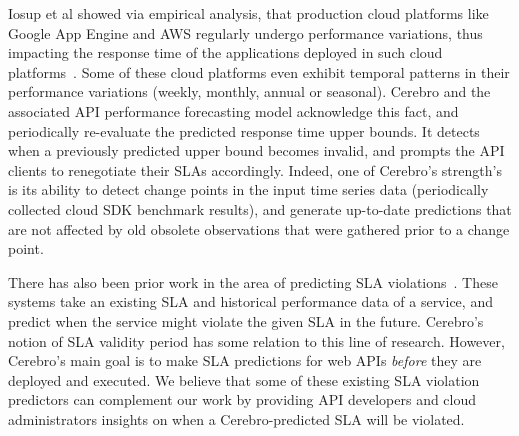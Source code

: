 Iosup et al showed via empirical analysis, that production cloud platforms like Google App Engine and AWS regularly
undergo performance variations, thus impacting the response time of the applications deployed in such
cloud platforms~\cite{5948601}. Some of these cloud platforms even exhibit temporal patterns 
in their performance variations (weekly, monthly, annual or seasonal). Cerebro and the associated API performance
forecasting model acknowledge this fact, and periodically re-evaluate the predicted response time upper bounds.
It detects when a previously predicted upper bound becomes invalid, and prompts the API clients to renegotiate their
SLAs accordingly. Indeed, one of Cerebro's strength's is its ability to detect change points in the input time series
data (periodically collected cloud SDK benchmark results), and generate up-to-date predictions that are not 
affected by old obsolete observations that were gathered prior to a change point.

There has also been prior work in the area of predicting 
SLA violations~\cite{Leitner10,6976585,Duan:2006:PIP:1142473.1142582}. 
These systems take an existing SLA and historical performance data of a service, and predict when the 
service might violate the given SLA in the future. 
Cerebro's notion of SLA validity period has some relation to this line of research. However,
Cerebro's main goal is to make SLA predictions for web APIs \textit{before} 
they are deployed and executed. We believe that
some of these existing SLA violation predictors can complement our 
work by providing API developers and cloud
administrators insights on when a Cerebro-predicted SLA will be violated.
